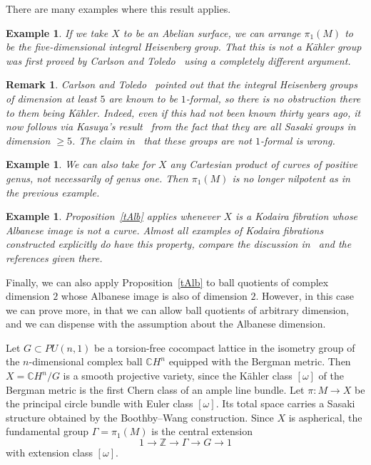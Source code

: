 \documentclass[12pt,leqno]{amsart}
\newcommand{\Z}{\mathbb{Z}}
\newcommand{\C}{\mathbb{C}}
\newtheorem{ex}[theor]{Example}
\newtheorem{remark}[theor]{Remark}
\begin{document}
There are many examples where this result applies.
\begin{ex}
If we take $X$ to be an Abelian surface, we can arrange $\pi_1(M)$ to be the five-dimensional
integral Heisenberg group. That this is not a K\"ahler group was first proved by
Carlson and Toledo~\cite{CT2} using a completely different argument.
\end{ex}

\begin{remark}
Carlson and Toledo~\cite{CT2} pointed out that the integral Heisenberg groups 
of dimension at least $5$ are known to be $1$-formal, so there is no obstruction
there to them being K\"ahler. Indeed, even if this had not been known thirty years 
ago, it now follows via Kasuya's result~\cite[Theorem~1.1]{Kas1} from the fact 
that they are all Sasaki groups in dimension $\geq 5$. The claim in~\cite[Section~3.1]{BFMT}
that these groups are not $1$-formal is wrong.
\end{remark}

\begin{ex}
We can also take for $X$ any Cartesian product of curves of positive genus,
not necessarily of genus one. Then $\pi_1(M)$ is no longer nilpotent as in 
the previous example.
\end{ex}

\begin{ex}
Proposition~\ref{tAlb} applies whenever $X$ is a Kodaira fibration whose Albanese
image is not a curve. Almost all examples of Kodaira fibrations constructed explicitly
do have this property, compare the discussion in~\cite{Bregman} and the references given there.
\end{ex}

Finally, we can also apply Proposition~\ref{tAlb} to ball quotients of complex dimension $2$
whose Albanese image is also of dimension $2$. However, in this case we can
prove more, in that we can allow ball quotients of arbitrary dimension, and we 
can dispense with the assumption about the Albanese dimension.

Let $G\subset PU(n,1)$ be a torsion-free cocompact lattice in the isometry group of the 
$n$-dimensional complex ball $\C H^n$ equipped with the Bergman metric. Then 
$X=\C H^n/G$ is a smooth projective variety, since the K\"ahler class $[\omega ]$ 
of the Bergman metric is the first Chern class of an ample line bundle. 
Let $\pi\colon M\longrightarrow X$ be the principal circle bundle with Euler class $[\omega ]$.
Its total space carries a Sasaki structure obtained by the Boothby--Wang construction. 
Since $X$ is aspherical, the fundamental group $\Gamma = \pi_1(M)$ is the central extension 
\begin{equation}\label{Gamma}
1 \longrightarrow \Z \longrightarrow \Gamma \longrightarrow G \longrightarrow 1 
\end{equation}
with extension class $[\omega ]$.
\end{document}
